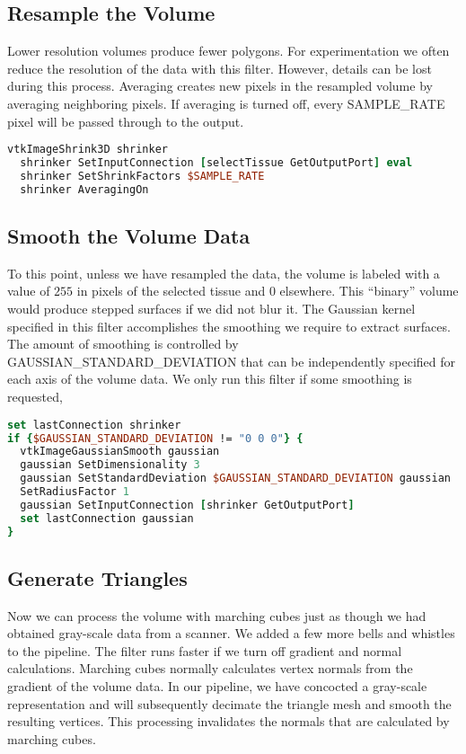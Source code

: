 \subsection{Resample the Volume}

Lower resolution volumes produce fewer polygons. For experimentation we often reduce the resolution of the data with this filter. However, details can be lost during this process. Averaging creates new pixels in the resampled volume by averaging neighboring pixels. If averaging is turned off, every SAMPLE\_RATE pixel will be passed through to the output.

\begin{lstlisting}[language=TCL, caption={Resample the Volume.}]
vtkImageShrink3D shrinker
  shrinker SetInputConnection [selectTissue GetOutputPort] eval
  shrinker SetShrinkFactors $SAMPLE_RATE
  shrinker AveragingOn
\end{lstlisting}

\subsection{Smooth the Volume Data}

To this point, unless we have resampled the data, the volume is labeled with a value of $255$ in pixels of the selected tissue and $0$ elsewhere. This ``binary'' volume would produce stepped surfaces if we did not blur it. The Gaussian kernel specified in this filter accomplishes the smoothing we require to extract surfaces. The amount of smoothing is controlled by  GAUSSIAN\_STANDARD\_DEVIATION that can be independently specified for each axis of the volume data. We only run this filter if some smoothing is requested,

\begin{lstlisting}[language=TCL, caption={Smooth the Volume Data.}]
set lastConnection shrinker
if {$GAUSSIAN_STANDARD_DEVIATION != "0 0 0"} {
  vtkImageGaussianSmooth gaussian
  gaussian SetDimensionality 3
  gaussian SetStandardDeviation $GAUSSIAN_STANDARD_DEVIATION gaussian
  SetRadiusFactor 1
  gaussian SetInputConnection [shrinker GetOutputPort]
  set lastConnection gaussian
}
\end{lstlisting}

\subsection{Generate Triangles}

Now we can process the volume with marching cubes just as though we had obtained gray-scale data from a scanner. We added a few more bells and whistles to the pipeline. The filter runs faster if we turn off gradient and normal calculations. Marching cubes normally calculates vertex normals from the gradient of the volume data. In our pipeline, we have concocted a gray-scale representation and will subsequently decimate the triangle mesh and smooth the resulting vertices. This processing invalidates the normals that are calculated by marching cubes. 


